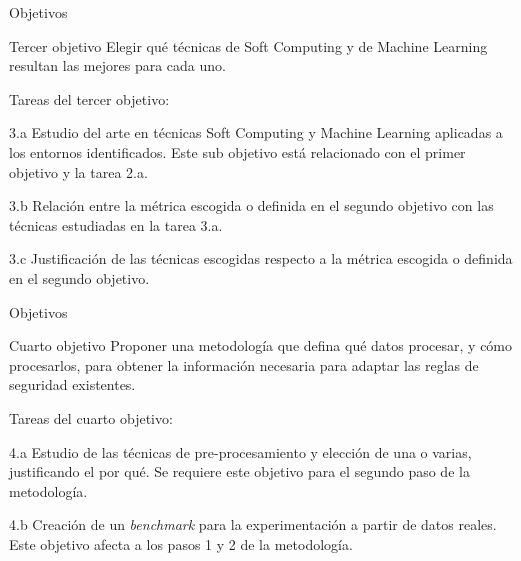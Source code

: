 \documentclass{beamer}
\begin{document}
\begin{frame}{Objetivos}

\begin{block}{Tercer objetivo}
Elegir qué técnicas de Soft Computing y de Machine Learning resultan las mejores para cada uno.
\end{block}

Tareas del tercer objetivo:

\begin{description}
  \begin{small}
  \item[3.a] Estudio del arte en técnicas Soft Computing y Machine Learning aplicadas a los entornos identificados. Este sub objetivo está relacionado con el primer objetivo y la tarea 2.a.
  \item[3.b] Relación entre la métrica escogida o definida en el segundo objetivo con las técnicas estudiadas en la tarea 3.a.
  \item[3.c] Justificación de las técnicas escogidas respecto a la métrica escogida o definida en el segundo objetivo.
  \end{small}
\end{description}

\end{frame}

\begin{frame}{Objetivos}

\begin{block}{Cuarto objetivo}
Proponer una metodología que defina qué datos procesar, y cómo procesarlos, para obtener la información necesaria para adaptar las reglas de seguridad existentes.
\end{block}

Tareas del cuarto objetivo:

\begin{description}
  \begin{small}
  \item[4.a] Estudio de las técnicas de pre-procesamiento y elección de una o varias, justificando el por qué. Se requiere este objetivo para el segundo paso de la metodología.
  \item[4.b] Creación de un \textit{benchmark} para la experimentación a partir de datos reales. Este objetivo afecta a los pasos 1 y 2 de la metodología.
  \end{small}
\end{description}

\end{frame}
\end{document}
